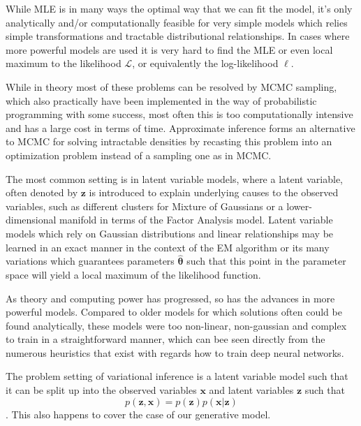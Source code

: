While MLE is in many ways the optimal way that we can fit the model, it's only
analytically and/or computationally feasible for very simple models which relies
simple transformations and tractable distributional relationships. In cases
where more powerful models are used it is very hard to find the MLE or even
local maximum to the likelihood $\mathcal{L}$, or equivalently the log-likelihood
$\ell$.

While in theory most of these problems can be resolved by MCMC
sampling, which also practically have been implemented in the way of
probabilistic programming with some
success\cite[Ch.~1]{brooks2011handbook}\cite{Carpenter_stan:a,
  journals/peerj-cs/SalvatierWF16}, most often this is too computationally
intensive and has a large cost in terms of time. Approximate inference forms an
alternative to MCMC for solving intractable densities by recasting this problem
into an optimization problem instead of a sampling one as in MCMC.

The most common setting is in latent variable models, where a latent
variable, often denoted by $\bm{z}$ is introduced to explain underlying causes
to the observed variables, such as different clusters for Mixture of
Gaussians or a lower-dimensional manifold in terms of the Factor Analysis
model\cite[page.~430-439, 583-586]{Bishop:2006}. Latent variable models which
rely on Gaussian distributions and linear relationships may be learned in an
exact manner in the context of the EM algorithm or its many variations which
guarantees parameters $\hat{\bm{\theta}}$ such that this point in the parameter
space will yield a local maximum of the likelihood function\cite{Dempster77maximumlikelihood, Neal98aview}.

As theory and computing power has progressed, so has the advances in more
powerful models. Compared to older models for which solutions often could be
found analytically, these models were too non-linear, non-gaussian and complex
to train in a straightforward manner, which can bee seen directly from the
numerous heuristics that exist with regards how to train deep neural
networks\cite{bengio_practical_2012, Larochelle:2009:EST:1577069.1577070}.

The problem setting of variational inference is a latent variable model such
that it can be split up into the observed variables $\bm{x}$ and latent
variables $\bm{z}$ such that
\begin{equation}
  \label{eq:latent_var_model}
  p(\bm{z}, \bm{x}) = p(\bm{z})p(\bm{x} | \bm{z})
\end{equation}. This also happens to cover the case of our generative model.

